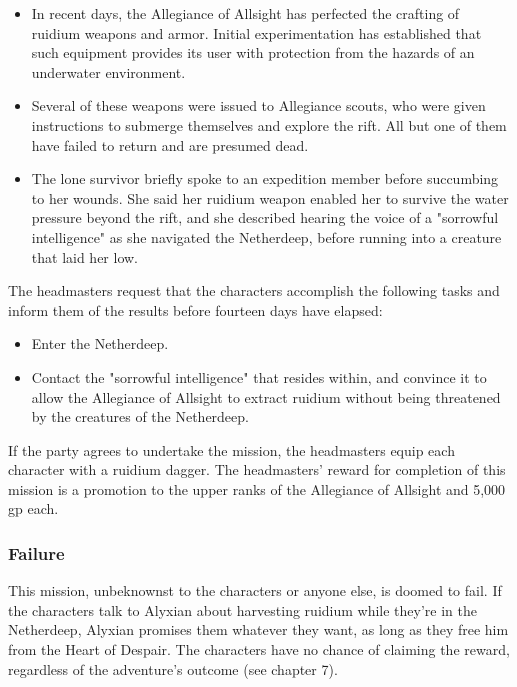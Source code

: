 \documentclass[10pt,a4paper,twoside,twocolumn,openany,nodeprecatedcode]{dndbook}
\begin{document}
\begin{itemize}
\item In recent days, the Allegiance of Allsight has perfected the crafting of ruidium weapons and armor. Initial experimentation has established that such equipment provides its user with protection from the hazards of an underwater environment.
\item Several of these weapons were issued to Allegiance scouts, who were given instructions to submerge themselves and explore the rift. All but one of them have failed to return and are presumed dead.
\item The lone survivor briefly spoke to an expedition member before succumbing to her wounds. She said her ruidium weapon enabled her to survive the water pressure beyond the rift, and she described hearing the voice of a "sorrowful intelligence" as she navigated the Netherdeep, before running into a creature that laid her low.
\end{itemize}

The headmasters request that the characters accomplish the following tasks and inform them of the results before fourteen days have elapsed:


\begin{itemize}
\item Enter the Netherdeep.
\item Contact the "sorrowful intelligence" that resides within, and convince it to allow the Allegiance of Allsight to extract ruidium without being threatened by the creatures of the Netherdeep.
\end{itemize}

If the party agrees to undertake the mission, the headmasters equip each character with a ruidium dagger. The headmasters' reward for completion of this mission is a promotion to the upper ranks of the Allegiance of Allsight and 5,000 gp each.

\subsubsection{Failure}
This mission, unbeknownst to the characters or anyone else, is doomed to fail. If the characters talk to Alyxian about harvesting ruidium while they're in the Netherdeep, Alyxian promises them whatever they want, as long as they free him from the Heart of Despair. The characters have no chance of claiming the reward, regardless of the adventure's outcome (see chapter 7).
\end{document}

